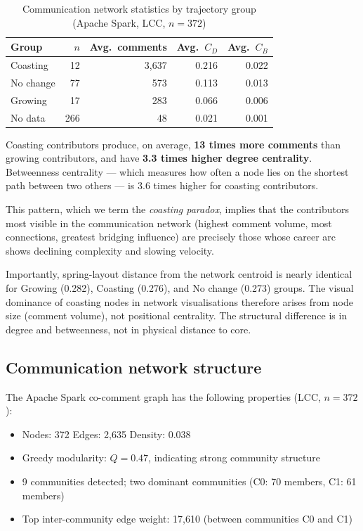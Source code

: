 \documentclass[12pt,a4paper]{article}
\begin{document}
\begin{table}[h]
\centering
\caption{Communication network statistics by trajectory group
(Apache Spark, LCC, $n=372$)}
\label{tab:comm_stats}
\begin{tabular}{lrrrr}
\toprule
Group & $n$ & Avg.\ comments & Avg.\ $C_D$ & Avg.\ $C_B$ \\
\midrule
Coasting  & 12  & 3,637 & 0.216 & 0.022 \\
No change & 77  & 573   & 0.113 & 0.013 \\
Growing   & 17  & 283   & 0.066 & 0.006 \\
No data   & 266 & 48    & 0.021 & 0.001 \\
\bottomrule
\end{tabular}
\end{table}

Coasting contributors produce, on average, \textbf{13 times more
comments} than growing contributors, and have \textbf{3.3 times
higher degree centrality}.
Betweenness centrality --- which measures how often a node lies on
the shortest path between two others --- is 3.6 times higher for
coasting contributors.

This pattern, which we term the \textit{coasting paradox}, implies
that the contributors most visible in the communication network
(highest comment volume, most connections, greatest bridging
influence) are precisely those whose career arc shows declining
complexity and slowing velocity.

Importantly, spring-layout distance from the network centroid is
nearly identical for Growing (0.282), Coasting (0.276), and No
change (0.273) groups. The visual dominance of coasting nodes in
network visualisations therefore arises from node size (comment
volume), not positional centrality. The structural difference is
in degree and betweenness, not in physical distance to core.

\subsection{Communication network structure}

The Apache Spark co-comment graph has the following properties
(LCC, $n=372$):
\begin{itemize}
  \item Nodes: 372 \quad Edges: 2{,}635 \quad Density: 0.038
  \item Greedy modularity: $Q = 0.47$, indicating strong community
    structure
  \item 9 communities detected; two dominant communities
    (C0: 70 members, C1: 61 members)
  \item Top inter-community edge weight: 17,610
    (between communities C0 and C1)
\end{itemize}
\end{document}

